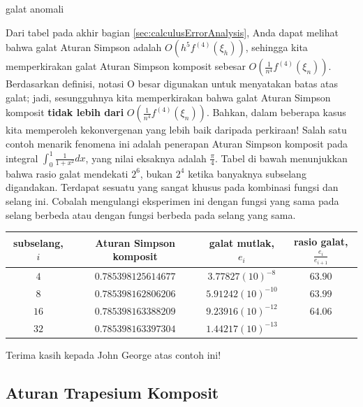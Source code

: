 \begin{digression}{galat anomali}

\noindent Dari tabel pada akhir bagian \ref{sec:calculusErrorAnalysis},
Anda dapat melihat bahwa galat Aturan Simpson adalah $O(h^{5}f^{(4)}(\xi_{h}))$,
sehingga kita memperkirakan galat Aturan Simpson komposit sebesar
$O\left(\frac{1}{n^{4}}f^{(4)}(\xi_{n})\right)$. Berdasarkan definisi,
notasi O besar digunakan untuk menyatakan batas atas galat; jadi,
sesungguhnya kita memperkirakan bahwa galat Aturan Simpson komposit
\textbf{tidak lebih dari } $O\left(\frac{1}{n^{4}}f^{(4)}(\xi_{n})\right)$.
Bahkan, dalam beberapa kasus kita memperoleh kekonvergenan yang lebih
baik daripada perkiraan! Salah satu contoh menarik fenomena ini adalah
penerapan Aturan Simpson komposit pada integral ${\displaystyle \int_{0}^{1}\frac{1}{1+x^{2}}dx}$,
yang nilai eksaknya adalah $\frac{\pi}{4}$. Tabel di bawah menunjukkan
bahwa rasio galat mendekati $2^{6}$, bukan $2^{4}$ ketika banyaknya
subselang digandakan. Terdapat sesuatu yang sangat khusus pada kombinasi
fungsi dan selang ini. Cobalah mengulangi eksperimen ini dengan fungsi
yang sama pada selang berbeda atau dengan fungsi berbeda pada selang
yang sama.
\begin{center}
\begin{tabular}{c|ccc}
subselang, $i$ & Aturan Simpson komposit & galat mutlak, $e_{i}$ & rasio galat, $\frac{e_{i}}{e_{i+1}}$\tabularnewline
\hline 
$4$ & $0.785398125614677$ & $3.77827(10)^{-8}$ & $63.90$\tabularnewline
$8$ & $0.785398162806206$ & $5.91242(10)^{-10}$ & $63.99$\tabularnewline
$16$ & $0.785398163388209$ & $9.23916(10)^{-12}$ & $64.06$\tabularnewline
$32$ & $0.785398163397304$ & $1.44217(10)^{-13}$ & \tabularnewline
\end{tabular}
\par\end{center}

\noindent Terima kasih kepada John George atas contoh ini!

\end{digression}

\subsection{Aturan Trapesium Komposit}


